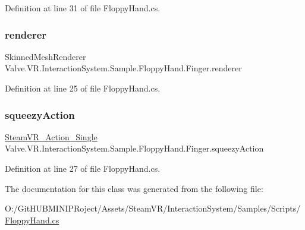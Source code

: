 Definition at line 31 of file Floppy\+Hand.\+cs.

\mbox{\label{class_valve_1_1_v_r_1_1_interaction_system_1_1_sample_1_1_floppy_hand_1_1_finger_aa17900f1725a656f59c4860f9cdc9f02}} 
\subsubsection{\texorpdfstring{renderer}{renderer}}
{\footnotesize\ttfamily Skinned\+Mesh\+Renderer Valve.\+V\+R.\+Interaction\+System.\+Sample.\+Floppy\+Hand.\+Finger.\+renderer}



Definition at line 25 of file Floppy\+Hand.\+cs.

\mbox{\label{class_valve_1_1_v_r_1_1_interaction_system_1_1_sample_1_1_floppy_hand_1_1_finger_a62ee9ab8729a763df7f2c3d904cb66d7}} 
\subsubsection{\texorpdfstring{squeezyAction}{squeezyAction}}
{\footnotesize\ttfamily \mbox{\hyperlink{class_valve_1_1_v_r_1_1_steam_v_r___action___single}{Steam\+V\+R\+\_\+\+Action\+\_\+\+Single}} Valve.\+V\+R.\+Interaction\+System.\+Sample.\+Floppy\+Hand.\+Finger.\+squeezy\+Action}



Definition at line 27 of file Floppy\+Hand.\+cs.



The documentation for this class was generated from the following file\+:\begin{DoxyCompactItemize}
\item 
O\+:/\+Git\+H\+U\+B\+M\+I\+N\+I\+P\+Roject/\+Assets/\+Steam\+V\+R/\+Interaction\+System/\+Samples/\+Scripts/\mbox{\hyperlink{_floppy_hand_8cs}{Floppy\+Hand.\+cs}}\end{DoxyCompactItemize}
